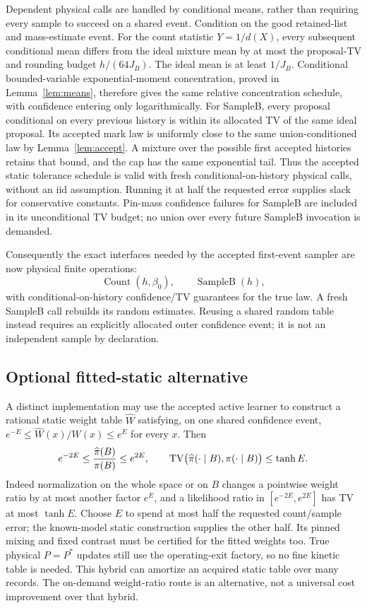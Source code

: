 Dependent physical calls are handled by conditional means, rather than
requiring every sample to succeed on a shared event.
Condition on the good retained-list and mass-estimate event. For the
count statistic $Y=1/d(X)$, every subsequent conditional mean differs
from the ideal mixture mean by at most the proposal-TV and rounding
budget $h/(64J_B)$. The ideal mean is at least $1/J_B$.
Conditional bounded-variable exponential-moment concentration, proved in
Lemma~\ref{lem:means}, therefore gives the same relative concentration
schedule, with confidence entering only logarithmically.
For SampleB, every proposal conditional on every previous history is
within its allocated TV of the same ideal proposal. Its accepted mark law
is uniformly close to the same union-conditioned law by
Lemma~\ref{lem:accept}. A mixture over the possible first accepted
histories retains that bound, and the cap has the same exponential tail.
Thus the accepted static tolerance schedule is valid with fresh
conditional-on-history physical calls, without an iid assumption.
Running it at half the requested error supplies slack for conservative
constants. Pin-mass confidence failures for SampleB are included in its
unconditional TV budget; no union over every future SampleB invocation
is demanded.

Consequently the exact interfaces needed by the accepted first-event
sampler are now physical finite operations:
\[
 \operatorname{Count}(h,\beta_0),\qquad
 \operatorname{SampleB}(h),
\]
with conditional-on-history confidence/TV guarantees for the true law.
A fresh SampleB call rebuilds its random estimates. Reusing a shared
random table instead requires an explicitly allocated outer confidence
event; it is not an independent sample by declaration.

\subsection{Optional fitted-static alternative}

A distinct implementation may use the accepted active learner to construct
a rational static weight table $\widehat W$ satisfying, on one shared
confidence event,
$e^{-E}\le\widehat W(x)/W(x)\le e^E$ for every $x$.
Then
\[
 e^{-2E}\le\frac{\widehat\pi(B)}{\pi(B)}\le e^{2E},
 \qquad
 \operatorname{TV}\bigl(\widehat\pi(\cdot\mid B),\pi(\cdot\mid B)\bigr)\le\tanh E .
\]
Indeed normalization on the whole space or on $B$ changes a pointwise
weight ratio by at most another factor $e^E$, and a likelihood ratio in
$[e^{-2E},e^{2E}]$ has TV at most $\tanh E$.
Choose $E$ to spend at most half the requested count/sample error;
the known-model static construction supplies the other half. Its pinned
mixing and fixed contrast must be certified for the fitted weights too.
True physical $P=P^*$ updates still use the operating-exit factory, so no
fine kinetic table is needed.
This hybrid can amortize an acquired static table over many records.
The on-demand weight-ratio route is an alternative, not a universal
cost improvement over that hybrid.
